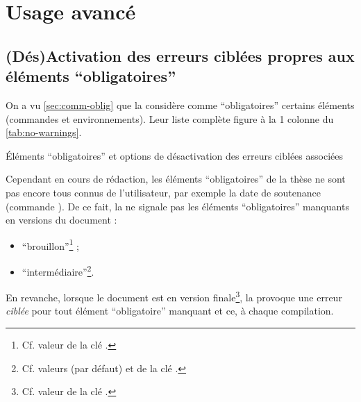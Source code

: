 \chapter{Usage avancé}\label{cha:usage-avance}

\section{(Dés)Activation des erreurs ciblées propres aux éléments
  \enquote{obligatoires}}\label{sec:non-affichage-cible}

On a vu \vref{sec:comm-oblig} que la \yatcl{} considère comme
\enquote{obligatoires} certains éléments (commandes et environnements). Leur
liste complète figure à la 1\iere{} colonne du \vref{tab:no-warnings}.
\begin{table}[ht]
  \centering
  
  \caption{Éléments \enquote{obligatoires} et options de désactivation des erreurs
    ciblées associées}
  \label{tab:no-warnings}
\end{table}

Cependant en cours de rédaction, les éléments \enquote{obligatoires} de la
thèse ne sont pas encore tous connus de l'utilisateur, par exemple la date de
soutenance (commande ). De ce fait, la \yatcl{} ne signale pas
les éléments \enquote{obligatoires} manquants en versions du document :
\begin{itemize}
\item \enquote{brouillon}\footnote{Cf. valeur  de la clé
    .} ;
\item \enquote{intermédiaire}\footnote{Cf. valeurs  (par
    défaut) et  de la clé .}.
\end{itemize}
En revanche, lorsque le document est en version finale\footnote{Cf. valeur
   de la clé .}, la \yatcl{} provoque une
erreur \emph{ciblée} pour tout élément \enquote{obligatoire} manquant et ce,
à chaque compilation.

